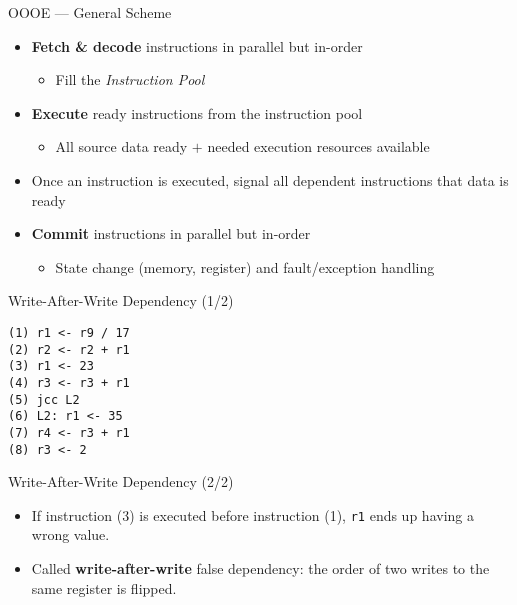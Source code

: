 \documentclass[aspectratio=169]{beamer}
\begin{document}
\begin{frame}{OOOE --- General Scheme}
\begin{itemize}
  \item \textbf{Fetch \& decode} instructions in parallel but in-order
  \begin{itemize}
    \item Fill the \emph{Instruction Pool}
  \end{itemize}
  \item \textbf{Execute} ready instructions from the instruction pool
  \begin{itemize}
    \item All source data ready $+$ needed execution resources available
  \end{itemize}
  \item Once an instruction is executed, signal all dependent instructions that data is ready
  \item \textbf{Commit} instructions in parallel but in-order
  \begin{itemize}
    \item State change (memory, register) and fault/exception handling
  \end{itemize}
\end{itemize}
\end{frame}

\begin{frame}[fragile]{Write-After-Write Dependency (1/2)}
\begin{verbatim}
(1) r1 <- r9 / 17
(2) r2 <- r2 + r1
(3) r1 <- 23
(4) r3 <- r3 + r1
(5) jcc L2
(6) L2: r1 <- 35
(7) r4 <- r3 + r1
(8) r3 <- 2
\end{verbatim}
\end{frame}

\begin{frame}{Write-After-Write Dependency (2/2)}
\begin{itemize}
  \item If instruction (3) is executed before instruction (1), \texttt{r1} ends up having a wrong value.
  \item Called \textbf{write-after-write} false dependency: the order of two writes to the same register is flipped.
\end{itemize}
\end{frame}
\end{document}
